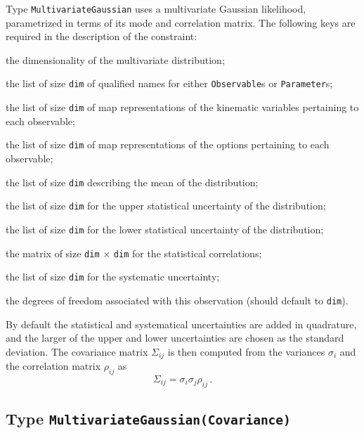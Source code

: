 Type \texttt{MultivariateGaussian} uses a multivariate Gaussian likelihood,
parametrized in terms of its mode and correlation matrix. The following keys
are required in the description of the constraint:
\begin{description}[labelwidth=.15\textwidth]
    \item[\texttt{dim}] the dimensionality of the multivariate distribution;
    \item[\texttt{observable}] the list of size \texttt{dim} of qualified names for either \texttt{Observable}s or \texttt{Parameter}s;
    \item[\texttt{kinematics}] the list of size \texttt{dim} of map representations of the kinematic variables pertaining to each observable;
    \item[\texttt{options}] the list of size \texttt{dim} of map representations of the options pertaining to each observable;
    \item[\texttt{mean}] the list of size \texttt{dim} describing the mean of the distribution;
    \item[\texttt{sigma-stat-hi}] the list of size \texttt{dim} for the upper statistical uncertainty of the distribution;
    \item[\texttt{sigma-stat-lo}] the list of size \texttt{dim} for the lower statistical uncertainty of the distribution;
    \item[\texttt{correlations}] the matrix of size \texttt{dim} $\times$ \texttt{dim} for the statistical correlations;
    \item[\texttt{sigma-sys}] the list of size \texttt{dim} for the systematic uncertainty;
    \item[\texttt{dof}] the degrees of freedom associated with this observation (should default to \texttt{dim}).
\end{description}
By default the statistical and systematical uncertainties are added in
quadrature, and the larger of the upper and lower uncertainties are chosen as
the standard deviation. The covariance matrix $\Sigma_{ij}$ is then computed from
the variances $\sigma_i$ and the correlation matrix $\rho_{ij}$ as
\begin{equation}
    \Sigma_{ij} = \sigma_i \sigma_j \rho_{ij}\,.
\end{equation}

\subsection{Type \texttt{MultivariateGaussian(Covariance)}}

